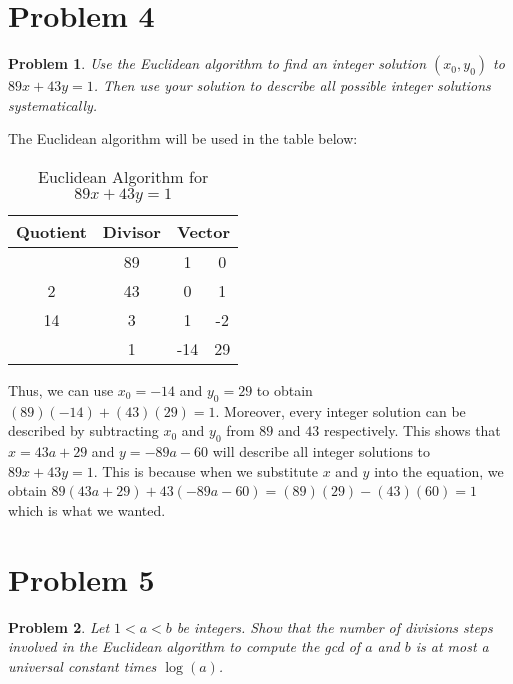 \documentclass[psamsfonts]{amsart}
\newtheorem{prob}{Problem}[section]
\newenvironment{sol}{{\bfseries Solution}}{\qedsymbol}
\theoremstyle{definition}
\theoremstyle{remark}
\numberwithin{equation}{section}
\begin{document}
\section{Problem 4}

\begin{prob}
Use the Euclidean algorithm to find an integer solution $(x_0,y_0)$ to $89x + 43 y = 1$. Then use your solution to describe all possible integer solutions systematically.
\end{prob}

\begin{sol}
The Euclidean algorithm will be used in the table below:
\begin{table}[h!]
\begin{tabular}{c | c | c  c}
Quotient & Divisor & \multicolumn{2}{c}{Vector} \\
\hline
 & 89 & 1 & 0 \\
2 & 43 & 0 & 1 \\
14 & 3 & 1 & -2 \\
& 1 & -14 & 29
\end{tabular}
\caption{Euclidean Algorithm for $89 x + 43 y = 1$}
\end{table}

Thus, we can use $x_0 = -14$ and $y_0 = 29$ to obtain $(89)(-14) + (43)(29) = 1$. Moreover, every integer solution can be described by subtracting $x_0$ and $y_0$ from $89$ and $43$ respectively. This shows that $x = 43 a + 29$ and $y = -89 a - 60$ will describe all integer solutions to $89x + 43 y = 1$. This is because when we substitute $x$ and $y$ into the equation, we obtain $89(43a + 29) + 43 (-89a - 60) = (89)(29) - (43)(60) = 1$ which is what we wanted.
\end{sol}

\section{Problem 5}

\begin{prob}
Let $1<a<b$ be integers. Show that the number of divisions steps involved in the Euclidean algorithm to compute the gcd of $a$ and $b$ is at most a universal constant times $\log(a)$. 
\end{prob}
\end{document}
